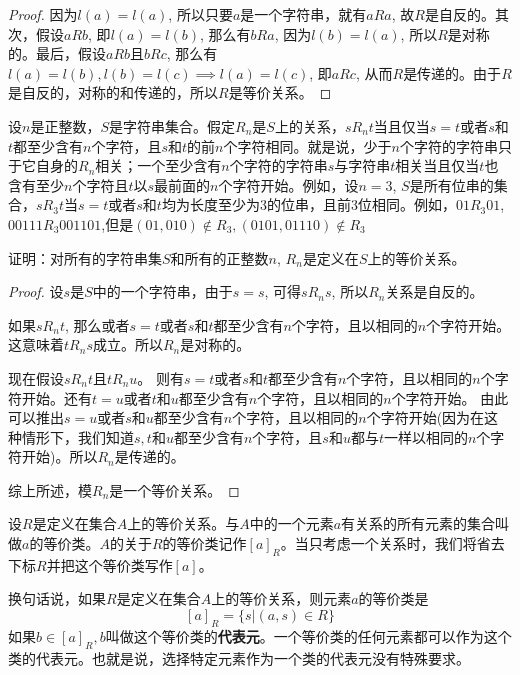 \begin{proof}
	因为$l(a)=l(a)$, 所以只要$a$是一个字符串，就有$aRa$, 故$R$是自反的。其次，假设$aRb$, 即$l(a)=l(b)$, 那么有$bRa$, 因为$l(b)=l(a)$, 所以$R$是对称的。最后，假设$aRb$且$bRc$, 那么有$l(a)=l(b),l(b)=l(c)\implies l(a)=l(c)$, 即$aRc$, 从而$R$是传递的。由于$R$是自反的，对称的和传递的，所以$R$是等价关系。
\end{proof}

\begin{example}\label{ex:eqstr}
	设$n$是正整数，$S$是字符串集合。假定$R_n$是$S$上的关系，$sR_n t$当且仅当$s=t$或者$s$和$t$都至少含有$n$个字符，且$s$和$t$的前$n$个字符相同。就是说，少于$n$个字符的字符串只于它自身的$R_n$相关；一个至少含有$n$个字符的字符串$s$与字符串$t$相关当且仅当$t$也含有至少$n$个字符且$t$以$s$最前面的$n$个字符开始。例如，设$n=3$, $S$是所有位串的集合，$sR_3t$当$s=t$或者$s$和$t$均为长度至少为3的位串，且前3位相同。例如，$01R_3 01$, $00111R_3 001101$,但是$(01,010)\notin R_3, (0101,01110)\notin R_3$
	
	证明：对所有的字符串集$S$和所有的正整数$n$, $R_n$是定义在$S$上的等价关系。
\end{example}

\begin{proof}
	
	设$s$是$S$中的一个字符串，由于$s=s$, 可得$sR_ns$, 所以$R_n$关系是自反的。
	
	如果$sR_nt$, 那么或者$s=t$或者$s$和$t$都至少含有$n$个字符，且以相同的$n$个字符开始。这意味着$tR_ns$成立。所以$R_n$是对称的。
	
	现在假设$sR_nt$且$tR_nu$。 则有$s=t$或者$s$和$t$都至少含有$n$个字符，且以相同的$n$个字符开始。还有$t=u$或者$t$和$u$都至少含有$n$个字符，且以相同的$n$个字符开始。 由此可以推出$s=u$或者$s$和$u$都至少含有$n$个字符，且以相同的$n$个字符开始(因为在这种情形下，我们知道$s,t$和$u$都至少含有$n$个字符，且$s$和$u$都与$t$一样以相同的$n$个字符开始)。所以$R_n$是传递的。
	
	综上所述，模$R_n$是一个等价关系。
\end{proof}

\begin{definition}[等价类]
	设$R$是定义在集合$A$上的等价关系。与$A$中的一个元素$a$有关系的所有元素的集合叫做$a$的等价类。$A$的关于$R$的等价类记作$[a]_R$。当只考虑一个关系时，我们将省去下标$R$并把这个等价类写作$[a]$。
	
	换句话说，如果$R$是定义在集合$A$上的等价关系，则元素$a$的等价类是
	\[ [a]_R = \{s|(a,s)\in R \}\]
	如果$b\in [a]_R,b$叫做这个等价类的\textbf{代表元}。一个等价类的任何元素都可以作为这个类的代表元。也就是说，选择特定元素作为一个类的代表元没有特殊要求。 
\end{definition}

